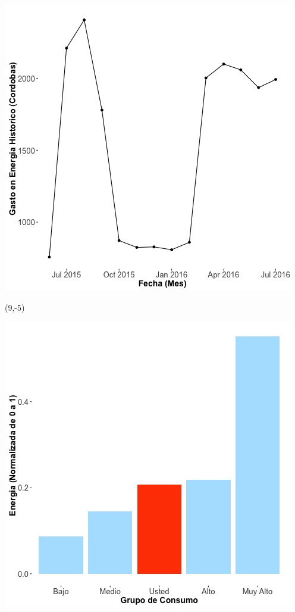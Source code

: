 \documentclass{article}\usepackage[]{graphicx}\usepackage[]{color}
\newenvironment{knitrout}{}{} %
\begin{document}
\begin{knitrout}
\color{fgcolor}
\includegraphics[scale=0.65]{figure/A19_historico_cordobas} 
\end{knitrout}

 \begin{textblock}{1}(9,-5)
\begin{minipage}{20em}
\begingroup

\endgroup
\end{minipage}
\end{textblock}


\begin{knitrout}
\color{fgcolor}
\includegraphics[scale=0.65]{figure/A19_neighbor_plot} 
\end{knitrout}
\end{document}
